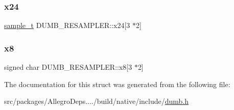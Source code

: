 \mbox{\label{struct_d_u_m_b___r_e_s_a_m_p_l_e_r_a80e6c85a2d43bfea9fa5ed2cb457683a}} 
\subsubsection{\texorpdfstring{x24}{x24}}
{\footnotesize\ttfamily \hyperlink{dumb_8h_a5cb1f64159c2e6122d3f12c081ce6db8}{sample\+\_\+t} D\+U\+M\+B\+\_\+\+R\+E\+S\+A\+M\+P\+L\+E\+R\+::x24\mbox{[}3 $\ast$2\mbox{]}}

\mbox{\label{struct_d_u_m_b___r_e_s_a_m_p_l_e_r_ace2aa215157597f46c2174a4d0378deb}} 
\subsubsection{\texorpdfstring{x8}{x8}}
{\footnotesize\ttfamily signed char D\+U\+M\+B\+\_\+\+R\+E\+S\+A\+M\+P\+L\+E\+R\+::x8\mbox{[}3 $\ast$2\mbox{]}}



The documentation for this struct was generated from the following file\+:\begin{DoxyCompactItemize}
\item 
src/packages/\+Allegro\+Deps..../build/native/include/\hyperlink{dumb_8h}{dumb.\+h}\end{DoxyCompactItemize}
